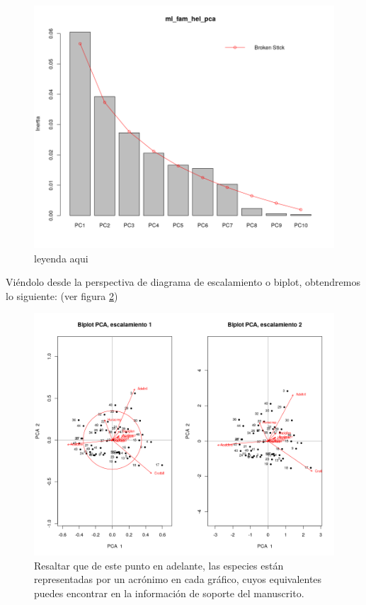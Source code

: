 \documentclass[11pt,]{article}
\begin{document}
\begin{figure}
\centering
\includegraphics{quebrada_especie.png}
\caption{\label{fig:quebrada_especie}leyenda aqui}
\end{figure}

Viéndolo desde la perspectiva de diagrama de escalamiento o biplot,
obtendremos lo siguiente: (ver figura \ref{fig:biplot_especie})

\begin{figure}
\centering
\includegraphics{biplot_especie.png}
\caption{\label{fig:biplot_especie}Resaltar que de este punto en
adelante, las especies están representadas por un acrónimo en cada
gráfico, cuyos equivalentes puedes encontrar en la información de
soporte del manuscrito.}
\end{figure}
\end{document}
